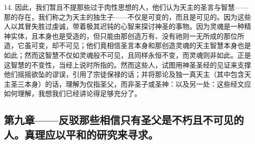14. 因此，我们暂且不提那些过于肉性思想的人，他们认为天主的圣言与智慧——那的存在，我们称之为天主的独生子——不仅是可变的，而且是可见的。因为这些人以其冒失胜过虔诚，带着极其迟钝的心智来探讨神圣的事物。因为灵魂是一种精神实体，且本身也是受造的，但只能由那创造万有、没有祂则一无所成的那位所造，它虽可变，却不可见；他们竟相信圣言本身和那创造灵魂的天主智慧本身也是如此；然而这智慧不仅如灵魂般不可见，且同样永恒不变，而灵魂则非如此。正是这智慧的不变性，当经上说时所指的。然而这些人，试图用神圣圣经的见证来支撑他们摇摇欲坠的谬误，引用了宗徒保禄的话；并将那论及独一真天主（其中包含天主圣三本身）的话，理解为仅指圣父，而非圣子或圣神：以及另一处：这些经文应如何理解，我想我们已经讲论得足够充分了。\par


\subsection{第九章——反驳那些相信只有圣父是不朽且不可见的人。真理应以平和的研究来寻求。}


